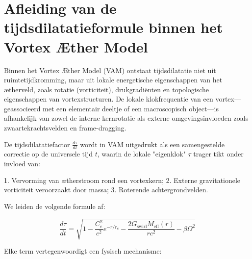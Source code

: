 
\section{Afleiding van de tijdsdilatatieformule binnen het Vortex Æther Model}

Binnen het Vortex Æther Model (VAM) ontstaat tijdsdilatatie niet uit ruimtetijdkromming, maar uit lokale energetische eigenschappen van het ætherveld, zoals rotatie (vorticiteit), drukgradiënten en topologische eigenschappen van vortexstructuren. De lokale klokfrequentie van een vortex—geassocieerd met een elementair deeltje of een macroscopisch object—is afhankelijk van zowel de interne kernrotatie als externe omgevingsinvloeden zoals zwaartekrachtsvelden en frame-dragging.

De tijdsdilatatiefactor $\frac{d\tau}{dt}$ wordt in VAM uitgedrukt als een samengestelde correctie op de universele tijd $t$, waarin de lokale "eigenklok" $\tau$ trager tikt onder invloed van:

1. Vervorming van ætherstroom rond een vortexkern;
2. Externe gravitationele vorticiteit veroorzaakt door massa;
3. Roterende achtergrondvelden.

We leiden de volgende formule af:

\begin{equation}
\frac{d\tau}{dt} = \sqrt{1 - \frac{C_e^2}{c^2} e^{-r/r_c} - \frac{2G_{\text{swirl}} M_{\text{eff}}(r)}{r c^2} - \beta \Omega^2}
\end{equation}

Elke term vertegenwoordigt een fysisch mechanisme:

